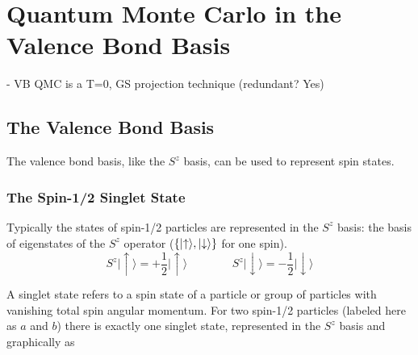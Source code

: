 
\chapter{Quantum Monte Carlo in the Valence Bond Basis}


{\color{red} - VB QMC is a T=0, GS projection technique (redundant? Yes)}
\\
\section{The Valence Bond Basis}

{\color{red} The valence bond basis, like the $S^z$ basis, can be used to represent spin states.}
\subsection{The Spin-1/2 Singlet State}

Typically the states of spin-1/2 particles are represented in the $S^z$ basis: the basis of eigenstates of the $S^z$ operator ($\{\lvert {\uparrow} \rangle,\lvert {\downarrow} \rangle\}$ for one spin).  
\begin{equation}
 	  S^z\lvert \uparrow \rangle = +\frac{1}{2} \lvert \uparrow \rangle
 	 \:\:\:    \:\:\:    \:\:\:    \:\:\:    \:\:\:    \:\:\: 
 	  S^z\lvert \downarrow \rangle = -\frac{1}{2} \lvert \downarrow \rangle
	   \label{SZ}
\end{equation}

A singlet state refers to a spin state of a particle or group of particles with vanishing total spin angular momentum.
For two spin-1/2 particles (labeled here as $a$ and $b$) there is exactly one singlet state, represented in the $S^z$ basis and graphically as


